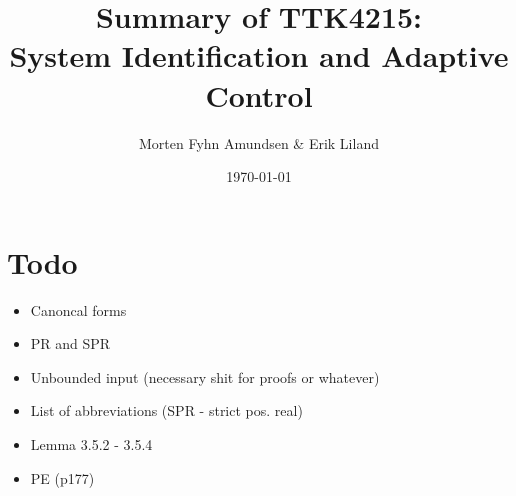 \documentclass[a4paper,12pt]{article}
\title{Summary of TTK4215:\\System Identification and Adaptive Control}
\author{Morten Fyhn Amundsen \& Erik Liland}
\date{\today}
\begin{document}
\maketitle
\tableofcontents

\section{Todo}
\begin{itemize}
	\item Canoncal forms
	\item PR and SPR
	\item Unbounded input (necessary shit for proofs or whatever)
	\item List of abbreviations (SPR - strict pos. real)
	\item Lemma 3.5.2 - 3.5.4
	\item PE (p177)
\end{itemize}







\end{document}
